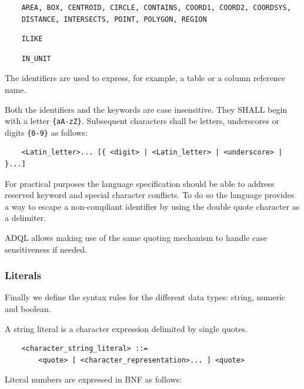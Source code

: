 \documentclass[11pt,a4paper]{ivoa}
\begin{document}
\begin{verbatim}
    AREA, BOX, CENTROID, CIRCLE, CONTAINS, COORD1, COORD2, COORDSYS,
    DISTANCE, INTERSECTS, POINT, POLYGON, REGION
\end{verbatim}

\begin{verbatim}
    ILIKE
\end{verbatim}

\begin{verbatim}
    IN_UNIT
\end{verbatim}

The identifiers are used to express, for example, a table or a column
reference name.

Both the identifiers and the keywords are case insensitive. They SHALL
begin with a letter \verb:{aA-zZ}:. Subsequent characters shall be letters,
underscores or digits \verb:{0-9}: as follows:

\begin{verbatim}
    <Latin_letter>... [{ <digit> | <Latin_letter> | <underscore> | }...]
\end{verbatim}

For practical purposes the language specification should be able to address
reserved keyword and special character conflicts. To do so the language
provides a way to escape a non-compliant identifier by using the double
quote character as a delimiter.

ADQL allows making use of the same quoting mechanism to handle case
sensitiveness if needed.

\subsubsection{Literals}
\label{sec:literals}

Finally we define the syntax rules for the different data types: string,
numeric and boolean.

A string literal is a character expression delimited by single quotes.

\begin{verbatim}
    <character_string_literal> ::=
        <quote> [ <character_representation>... ] <quote>
\end{verbatim}

Literal numbers are expressed in BNF as follows:
\end{document}
